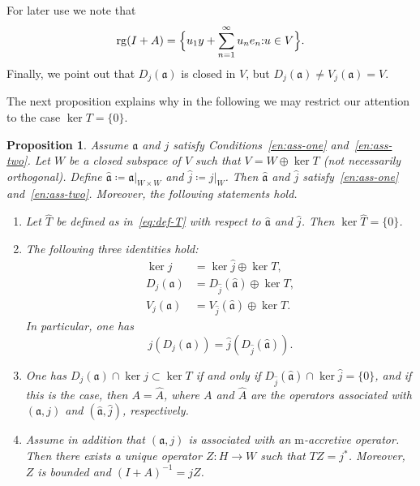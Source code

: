 \documentclass[a4paper,oneside,12pt]{amsart}
\theoremstyle{plain}
\newtheorem{proposition}[theorem]{Proposition}
\theoremstyle{definition}
\newenvironment{example}
{\pushQED{\qed}

\examplex}
{\popQED\endexamplex}
\begin{document}
\begin{example}
For later use we note that
\begin{equation}\label{eq:ex-nonclos-opran}
   \operatorname{rg}(I+A) = {{\ifthenelse{\equal{B}{auto}}{\left\{{u_1 y + \sum_{n=1}^\infty u_n e_n}{:} {u \in V}\right\}}{}
\ifthenelse{\equal{B}{b}}{\bigl\{{u_1 y + \sum_{n=1}^\infty u_n e_n}{:} {u \in V}\bigr\}}{}
\ifthenelse{\equal{B}{B}}{\Bigl\{{u_1 y + \sum_{n=1}^\infty u_n e_n}{:} {u \in V}\Bigr\}}{}
}}.
\end{equation}
Finally, we point out that $D_j({{\mathfrak{{a}}}})$ is closed in $V$,
but $D_j({{\mathfrak{{a}}}})\ne V_j({{\mathfrak{{a}}}})=V$.
\end{example}

The next proposition explains why in the following we may restrict our attention to the case $\ker T=\{0\}$.
\begin{proposition}\label{prop:Tinjective}
Assume ${{\mathfrak{{a}}}}$ and $j$ satisfy Conditions~\ref{en:ass-one} and~\ref{en:ass-two}.
Let $W$ be a closed subspace of $V$ such that $V=W\oplus \ker T$ (not necessarily orthogonal).
Define ${{\mathfrak{{\hat{a}}}}}\coloneqq{\ensuremath{{{{\mathfrak{{a}}}}}|_{{W\times W}}}}$ and $\hat{j}\coloneqq{\ensuremath{{j}|_{{W}}}}$.
Then ${{\mathfrak{{\hat{a}}}}}$ and $\hat{j}$ satisfy~\ref{en:ass-one} and~\ref{en:ass-two}. Moreover, the following statements hold.
\begin{enumerate}[\upshape (a)]
\item\label{en:ker-That}
Let $\widehat{T}$ be defined as in~\eqref{eq:def-T} with respect to ${{\mathfrak{{\hat{a}}}}}$ and $\hat{j}$. Then $\ker\widehat{T}=\{0\}$.
\item \label{en:res-ident}
The following three identities hold:
\begin{align*}
    \ker j &= \ker\hat{j}\oplus\ker T,\\
    D_j({{\mathfrak{{a}}}}) &= D_{\hat{j}}({{\mathfrak{{\hat{a}}}}}) \oplus \ker T,\\
    V_j({{\mathfrak{{a}}}}) &= V_{\hat{j}}({{\mathfrak{{\hat{a}}}}}) \oplus \ker T.
\end{align*}
In particular, one has
\begin{equation}\label{eq:Dja-Djhah}
    j(D_j({{\mathfrak{{a}}}})) = \hat{j}(D_{\hat{j}}({{\mathfrak{{\hat{a}}}}})).
\end{equation}
\item\label{en:res-op}
One has $D_j({{\mathfrak{{a}}}})\cap\ker j\subset\ker T$ if and only if $D_{\hat{j}}({{\mathfrak{{\hat{a}}}}})\cap\ker\hat{j}=\{0\}$, and if this is the case, then
$A=\widehat{A}$, where $A$ and $\widehat{A}$ are the operators associated with $({{\mathfrak{{a}}}},j)$ and $({{\mathfrak{{\hat{a}}}}},\hat{j})$, respectively.
\item\label{en:Z-bdd}
Assume in addition that $({{\mathfrak{{a}}}},j)$ is associated with an {\ensuremath{\text{m}}}-accretive operator. 
Then there exists a unique operator $Z\colon H\to W$ such that $TZ=j^*$.
Moreover, $Z$ is bounded and $(I+A)^{-1}=j Z$.
\end{enumerate}
\end{proposition}
\end{document}
